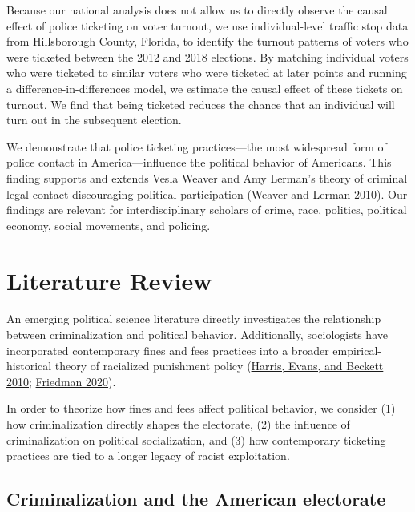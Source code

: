 \documentclass[
  12pt,
]{article}
\begin{document}
Because our national analysis does not allow us to directly observe the causal effect of police ticketing on voter turnout, we use individual-level traffic stop data from Hillsborough County, Florida, to identify the turnout patterns of voters who were ticketed between the 2012 and 2018 elections. By matching individual voters who were ticketed to similar voters who were ticketed at later points and running a difference-in-differences model, we estimate the causal effect of these tickets on turnout. We find that being ticketed reduces the chance that an individual will turn out in the subsequent election.

We demonstrate that police ticketing practices---the most widespread form of police contact in America---influence the political behavior of Americans. This finding supports and extends Vesla Weaver and Amy Lerman's theory of criminal legal contact discouraging political participation (\protect\hyperlink{ref-Weaver2010}{Weaver and Lerman 2010}). Our findings are relevant for interdisciplinary scholars of crime, race, politics, political economy, social movements, and policing.

\hypertarget{literature-review}{%
\section*{Literature Review}\label{literature-review}}

An emerging political science literature directly investigates the relationship between criminalization and political behavior. Additionally, sociologists have incorporated contemporary fines and fees practices into a broader empirical-historical theory of racialized punishment policy (\protect\hyperlink{ref-Harris2010}{Harris, Evans, and Beckett 2010}; \protect\hyperlink{ref-Friedman2020}{Friedman 2020}).

In order to theorize how fines and fees affect political behavior, we consider (1) how criminalization directly shapes the electorate, (2) the influence of criminalization on political socialization, and (3) how contemporary ticketing practices are tied to a longer legacy of racist exploitation.

\hypertarget{criminalization-and-the-american-electorate}{%
\subsection*{Criminalization and the American electorate}\label{criminalization-and-the-american-electorate}}
\end{document}
